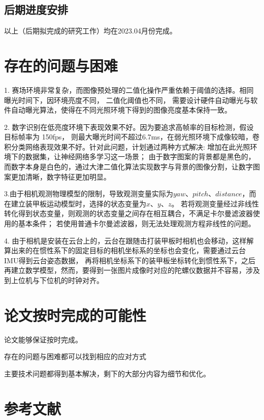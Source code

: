 \subsection{后期进度安排}
以上（后期拟完成的研究工作）均在2023.04月份完成。
\section{存在的问题与困难}
1. 赛场环境非常复杂，而图像预处理的二值化操作严重依赖于阈值的选择。相同曝光时间下，因环境亮度不同， 二值化阈值也不同，
需要设计硬件自动曝光与软件自动曝光算法，使得在不同光照环境下得到的图像亮度基本保持一致。\par
2. 数字识别在低亮度环境下表现效果不好。因为要追求高帧率的目标检测，假设目标帧率为 150fps，
则最大曝光时间不超过6.7ms，在弱光照环境下成像较暗，卷积分类网络表现效果不好。针对此问题，计划通过两种方式解决:
增加在此光照环境下的数据集，让神经网络多学习这一场景；
由于数字图案的背景都是黑色的，而数字本身是白色的，通过大津二值化\cite{otsu1979threshold}算法实现数字与背景的图像分割，让数字图案更加清晰，数字特征更加明显。\par
3.由于相机观测物理模型的限制，导致观测变量实际为$yaw$、$pitch$、$distance$，而在建立装甲板运动模型时，选择的状态变量为$x$、$y$、$z$。
若将观测变量经过非线性转化得到状态变量，则观测的状态变量之间存在相互耦合，不满足卡尔曼滤波器使用的基本条件；
若使用普通卡尔曼滤波器，则无法处理观测方程非线性的问题。\par
4. 由于相机是安装在云台上的，云台在跟随击打装甲板时相机也会移动，这样解算出来的在惯性系下的固定目标的相机坐标系的坐标也会变化，需要通过云台IMU得到云台姿态数据，
再将相机坐标系下的装甲板坐标转化到惯性系下，之后再建立数学模型，然而，要得到一张图片成像时对应的陀螺仪数据并不容易，涉及到上位机与下位机的时钟对齐。
\section{论文按时完成的可能性}
论文能够保证按时完成。\par
存在的问题与困难都可以找到相应的应对方式\par
主要技术问题都得到基本解决，剩下的大部分内容为细节和优化。\par

\section{参考文献}



